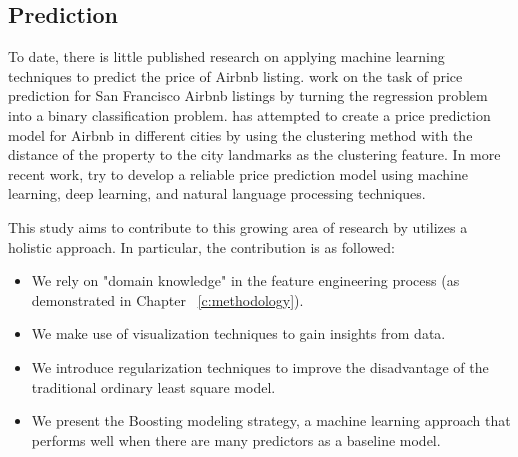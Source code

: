 \subsection{Prediction}

To date, there is little published research on applying machine learning
techniques to predict the price of Airbnb listing.
\textcite{tang2015neighborhood} work on the task of price prediction for San
Francisco Airbnb listings by turning the regression problem into a binary
classification problem.
\textcite{li2016reasonable} has attempted to create a price prediction model for
Airbnb in different cities by using the clustering method with the distance of
the property to the city landmarks as the clustering feature.
In more recent work, \textcite{kalehbasti2019airbnb}  try to develop a reliable
price prediction model using machine learning, deep learning, and natural
language processing techniques.


This study aims to contribute to this growing area of research by utilizes a
holistic approach. In particular, the contribution is as followed:
\begin{itemize}
  \item We rely on "domain knowledge" in the feature engineering process (as
    demonstrated in Chapter ~\ref{c:methodology}).
  \item We make use of visualization techniques to gain insights from data.
  \item We introduce regularization techniques to improve the disadvantage of the
  traditional ordinary least square model.
  \item We present the Boosting modeling strategy, a machine learning approach
    that performs well when there are many predictors as a baseline model.
\end{itemize}
